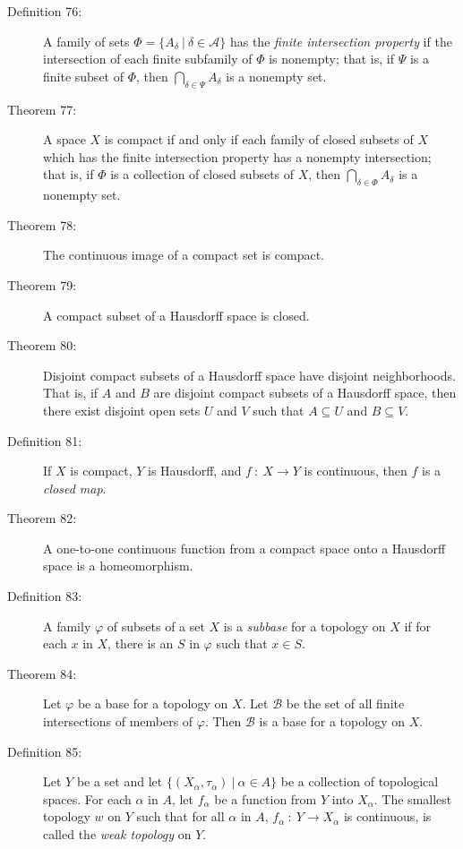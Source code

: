 \documentclass{article}
\begin{document}
\begin{description}
  \item[Definition 76:] A family of sets $\Phi = \{ A_{\delta} \ \vert \ \delta \in \mathcal{A} \}$ has the \emph{finite intersection property} if the intersection of each finite subfamily of $\Phi$ is nonempty; that is, if $\Psi$ is a finite subset of $\Phi$, then $\displaystyle{ \bigcap_{\delta \in \Psi} A_{\delta} }$ is a nonempty set.

  \item[Theorem 77:] A space $X$ is compact if and only if each family of closed subsets of $X$ which has the finite intersection property has a nonempty intersection; that is, if $\Phi$ is a collection of closed subsets of $X$, then $\displaystyle{ \bigcap_{\delta \in \Phi} A_{\delta} }$ is a nonempty set.

  \item[Theorem 78:] The continuous image of a compact set is compact.

  \item[Theorem 79:] A compact subset of a Hausdorff space is closed.

  \item[Theorem 80:] Disjoint compact subsets of a Hausdorff space have disjoint neighborhoods. That is, if $A$ and $B$ are disjoint compact subsets of a Hausdorff space, then there exist disjoint open sets $U$ and $V$ such that $A \subseteq U$ and $B \subseteq V$.

  \item[Definition 81:] If $X$ is compact, $Y$ is Hausdorff, and $f \ : \ X \rightarrow Y$ is continuous, then $f$ is a \emph{closed map}.

  \item[Theorem 82:] A one-to-one continuous function from a compact space onto a Hausdorff space is a homeomorphism.

  \item[Definition 83:] A family $\varphi$ of subsets of a set $X$ is a \emph{subbase} for a topology on $X$ if for each $x$ in $X$, there is an $S$ in $\varphi$ such that $x \in S$.

  \item[Theorem 84:] Let $\varphi$ be a base for a topology on $X$. Let $\mathcal{B}$ be the set of all finite intersections of members of $\varphi$. Then $\mathcal{B}$ is a base for a topology on $X$.

  \item[Definition 85:] Let $Y$ be a set and let $\{ (X_{\alpha}, \tau _{\alpha}) \ \vert \ \alpha \in A \}$ be a collection of topological spaces. For each $\alpha$ in $A$, let $f_{\alpha}$ be a function from $Y$ into $X_{\alpha}$. The smallest topology $w$ on $Y$ such that for all $\alpha$ in $A$, $f_{\alpha} \ : \ Y \rightarrow X_{\alpha}$ is continuous, is called the \emph{weak topology} on $Y$.


\end{description}
\end{document}
